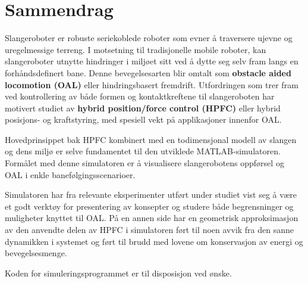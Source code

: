 \chapter{Sammendrag}




Slangeroboter er robuste seriekoblede roboter som evner å traversere ujevne og uregelmessige terreng. I motsetning til tradisjonelle mobile roboter, kan slangeroboter utnytte hindringer i miljøet sitt ved å dytte seg selv fram langs en forhåndsdefinert bane. Denne bevegelsesarten blir omtalt som \textbf{obstacle aided locomotion (OAL)} eller hindringsbasert fremdrift. Utfordringen som trer fram ved kontrollering av både formen og kontaktkreftene til slangeroboten har motivert studiet av  \textbf{hybrid position/force control (HPFC)} eller hybrid posisjons- og kraftstyring, med spesiell vekt på applikasjoner innenfor OAL.

Hovedprinsippet bak HPFC kombinert med en todimensjonal modell av slangen og dens miljø er selve fundamentet til den utviklede MATLAB-simulatoren. Formålet med denne simulatoren er å visualisere slangerobotens oppførsel og OAL i enkle banefølgingsscenarioer.

Simulatoren har fra relevante eksperimenter utført under studiet vist seg å være et godt verktøy for presentering av konsepter og studere både begrensninger og muligheter knyttet til OAL. På en annen side har en geometrisk approksimasjon av den anvendte delen av HPFC i simulatoren ført til noen avvik fra den sanne dynamikken i systemet og ført til brudd med lovene om konservasjon av energi og bevegelsesmenge.

Koden for simuleringsprogrammet er til disposisjon ved ønske.

\makeatletter
{}


\makeatother







